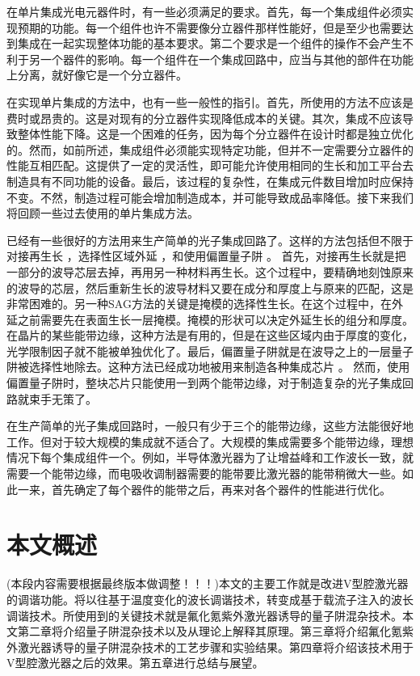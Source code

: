 \documentclass{ZJUthesis}
\begin{document}
在单片集成光电元器件时，有一些必须满足的要求。首先，每一个集成组件必须实现预期的功能。每一个组件也许不需要像分立器件那样性能好，但是至少也需要达到集成在一起实现整体功能的基本要求。第二个要求是一个组件的操作不会产生不利于另一个器件的影响。每一个组件在一个集成回路中，应当与其他的部件在功能上分离，就好像它是一个分立器件。

在实现单片集成的方法中，也有一些一般性的指引。首先，所使用的方法不应该是费时或昂贵的。这是对现有的分立器件实现降低成本的关键。其次，集成不应该导致整体性能下降。这是一个困难的任务，因为每个分立器件在设计时都是独立优化的。然而，如前所述，集成组件必须能实现特定功能，但并不一定需要分立器件的性能互相匹配。这提供了一定的灵活性，即可能允许使用相同的生长和加工平台去制造具有不同功能的设备。最后，该过程的复杂性，在集成元件数目增加时应保持不变。不然，制造过程可能会增加制造成本，并可能导致成品率降低。接下来我们将回顾一些过去使用的单片集成方法。

已经有一些很好的方法用来生产简单的光子集成回路了。这样的方法包括但不限于对接再生长 \cite{binsma1997characterization-BJR}，选择性区域外延 \cite{aoki1993ingaas-SAG}，和使用偏置量子阱 \cite{mason1999widely-offset}。 首先，对接再生长就是把一部分的波导芯层去掉，再用另一种材料再生长。这个过程中，要精确地刻蚀原来的波导的芯层，然后重新生长的波导材料又要在成分和厚度上与原来的匹配，这是非常困难的。另一种SAG方法的关键是掩模的选择性生长。在这个过程中，在外延之前需要先在表面生长一层掩模。掩模的形状可以决定外延生长的组分和厚度。在晶片的某些能带边缘，这种方法是有用的，但是在这些区域内由于厚度的变化，光学限制因子就不能被单独优化了。最后，偏置量子阱就是在波导之上的一层量子阱被选择性地除去。这种方法已经成功地被用来制造各种集成芯片 \cite{mason1999widely-offset} \cite{mason2000design-offset} \cite{mason1998tunable-offset} \cite{fish1998compact-offset}。 然而，使用偏置量子阱时，整块芯片只能使用一到两个能带边缘，对于制造复杂的光子集成回路就束手无策了。

在生产简单的光子集成回路时，一般只有少于三个的能带边缘，这些方法能很好地工作。但对于较大规模的集成就不适合了。大规模的集成需要多个能带边缘，理想情况下每个集成组件一个。例如，半导体激光器为了让增益峰和工作波长一致，就需要一个能带边缘，而电吸收调制器需要的能带要比激光器的能带稍微大一些。如此一来，首先确定了每个器件的能带之后，再来对各个器件的性能进行优化。

\section{本文概述}

(本段内容需要根据最终版本做调整！！！)本文的主要工作就是改进V型腔激光器的调谐功能。将以往基于温度变化的波长调谐技术，转变成基于载流子注入的波长调谐技术。所使用到的关键技术就是氟化氪紫外激光器诱导的量子阱混杂技术。本文第二章将介绍量子阱混杂技术以及从理论上解释其原理。第三章将介绍氟化氪紫外激光器诱导的量子阱混杂技术的工艺步骤和实验结果。第四章将介绍该技术用于V型腔激光器之后的效果。第五章进行总结与展望。
\end{document}
